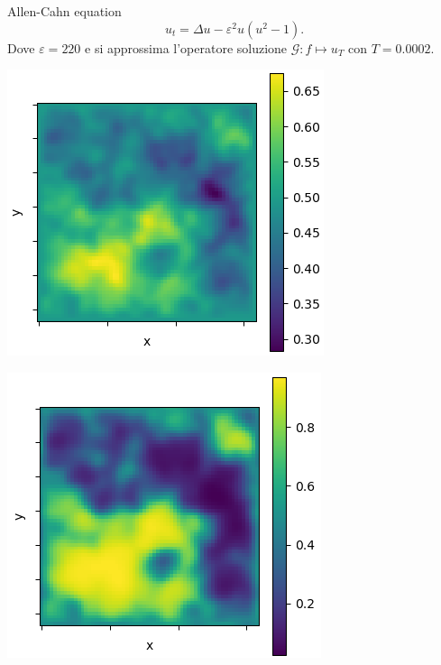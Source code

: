 \documentclass[aspectratio=169]{beamer}
\begin{document}
\begin{frame}[t]{Allen-Cahn equation}
   \[
   u_{t} = \Delta u - \varepsilon^{2} u (u^{2}-1).
   \] 
   Dove $\varepsilon = 220 $ e si approssima l'operatore soluzione $\mathcal{G}: f\mapsto u_{T}$ con $T = 0.0002$.
    \begin{center}
        \begin{minipage}{0.24\textwidth}
            \includegraphics[width=\textwidth]{operators/allen/input.png}
        \end{minipage}
        \hfill
        \begin{minipage}{0.24\textwidth}
            \includegraphics[width=\textwidth]{operators/allen/output.png}

\end{minipage}
\end{center}
\end{frame}
\end{document}
